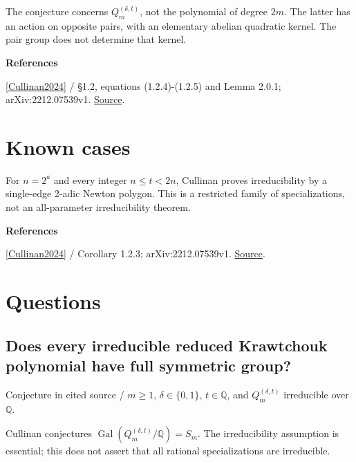 \documentclass[11pt,a4paper,oneside,openany]{book}
\newcommand{\atlasdisplay}[1]{\par\begingroup\centering\vspace{3pt}\noindent\adjustbox{max width=\linewidth}{\(\displaystyle #1\)}\par\vspace{5pt}\endgroup}
\newenvironment{sources}{\par\smallskip\begingroup\footnotesize\color{atlasgray}\leftskip=10pt\setlength{\parskip}{2pt}}{\par\endgroup\smallskip}
\begin{document}
\atlasdisplay{\mathcal K_n^{(t)}(x+t/2)=x^\delta Q_m^{(\delta,t)}(x^2).}
\color{black} The conjecture concerns \(Q_m^{(\delta,t)}\), not the polynomial of degree \(2m\). The latter has an action on opposite pairs, with an elementary abelian quadratic kernel. The pair group does not determine that kernel.\par
\begin{sources}
\textbf{References}\par\smallskip
\noindent\hyperlink{ref:Cullinan2024}{[Cullinan2024]} / §1.2, equations (1.2.4)-(1.2.5) and Lemma 2.0.1; arXiv:2212.07539v1.  \href{https://www.mathjournals.org/jrms/2024-039-004/2024-039-004-002.html}{Source}.\par
\end{sources}\color{black}
\section{Known cases}
\color{black} For \(n=2^a\) and every integer \(n\le t<2n\), Cullinan proves irreducibility by a single-edge 2-adic Newton polygon. This is a restricted family of specializations, not an all-parameter irreducibility theorem.\par
\begin{sources}
\textbf{References}\par\smallskip
\noindent\hyperlink{ref:Cullinan2024}{[Cullinan2024]} / Corollary 1.2.3; arXiv:2212.07539v1.  \href{https://www.mathjournals.org/jrms/2024-039-004/2024-039-004-002.html}{Source}.\par
\end{sources}\color{black}
\section*{Questions}
\subsection*{Does every irreducible reduced Krawtchouk polynomial have full symmetric group?}
{\small\sffamily\color{atlasgold}Conjecture in cited source / \(m\ge1\), \(\delta\in\{0,1\}\), \(t\in\mathbb Q\), and \(Q_m^{(\delta,t)}\) irreducible over \(\mathbb Q\).}\par\smallskip
\color{black} Cullinan conjectures \(\operatorname{Gal}(Q_m^{(\delta,t)}/\mathbb Q)=S_m\). The irreducibility assumption is essential; this does not assert that all rational specializations are irreducible.\par
\end{document}
